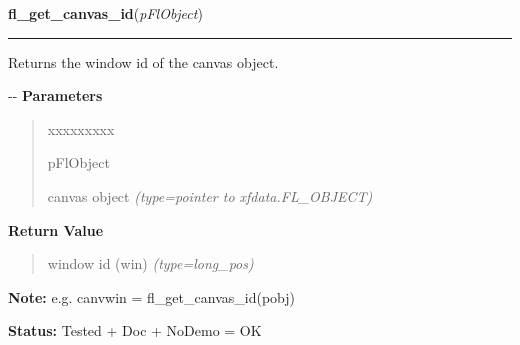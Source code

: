     \label{xformslib:flcanvas:fl_get_canvas_id}

    \vspace{0.5ex}

\hspace{.8\funcindent}\begin{boxedminipage}{\funcwidth}

    \raggedright \textbf{fl\_get\_canvas\_id}(\textit{pFlObject})

    \vspace{-1.5ex}

    \rule{\textwidth}{0.5\fboxrule}
\setlength{\parskip}{2ex}

Returns the window id of the canvas object.

-{}-
\setlength{\parskip}{1ex}
      \textbf{Parameters}
      \vspace{-1ex}

      \begin{quote}
        \begin{Ventry}{xxxxxxxxx}

          \item[pFlObject]


canvas object
            {\it (type=pointer to xfdata.FL\_OBJECT)}

        \end{Ventry}

      \end{quote}

      \textbf{Return Value}
    \vspace{-1ex}

      \begin{quote}

window id (win)
      {\it (type=long\_pos)}

      \end{quote}

\textbf{Note:} 
e.g. canvwin = fl\_get\_canvas\_id(pobj)


\textbf{Status:} 
Tested + Doc + NoDemo = OK


    \end{boxedminipage}

    \label{xformslib:flcanvas:fl_get_canvas_colormap}

    \vspace{0.5ex}

